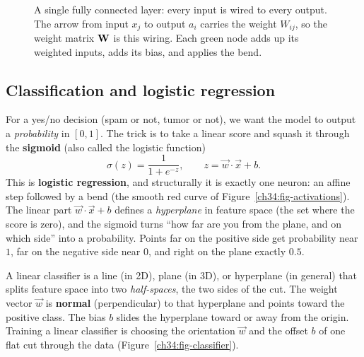 \begin{figure}[htbp]
\centering
{}
\caption{A single fully connected layer: every input is wired to every output. The arrow
from input $x_j$ to output $a_i$ carries the weight $W_{ij}$, so the weight matrix
$\mathbf{W}$ is this wiring. Each green node adds up its weighted inputs, adds its bias, and
applies the bend.}
\label{ch34:fig-layer}
\end{figure}

\subsection{Classification and logistic regression}

For a yes/no decision (spam or not, tumor or not), we want the model to output a
\emph{probability} in $[0,1]$. The trick is to take a linear score and squash it through
the \textbf{sigmoid} (also called the logistic function)
\[
\sigma(z)=\frac{1}{1+e^{-z}}, \qquad z = \vec{w}\cdot\vec{x}+b.
\]
This is \textbf{logistic regression}, and structurally it is exactly one neuron: an
affine step followed by a bend (the smooth red curve of Figure~\ref{ch34:fig-activations}).
The linear part $\vec{w}\cdot\vec{x}+b$ defines a
\emph{hyperplane} in feature space (the set where the score is zero), and the sigmoid
turns ``how far are you from the plane, and on which side'' into a probability. Points far
on the positive side get probability near $1$, far on the negative side near $0$, and
right on the plane exactly $0.5$.

\begin{intuitionbox}
A linear classifier is a line (in 2D), plane (in 3D), or
hyperplane (in general) that splits feature space into two \emph{half-spaces}, the two
sides of the cut. The weight vector $\vec{w}$ is \textbf{normal} (perpendicular) to that
hyperplane and points toward the positive class. The bias $b$ slides the hyperplane toward
or away from the origin. Training a linear classifier is choosing the orientation
$\vec{w}$ and the offset $b$ of one flat cut through the data
(Figure~\ref{ch34:fig-classifier}).
\end{intuitionbox}

